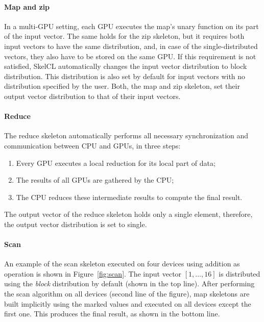 \paragraph{Map and zip}
In a multi-GPU setting, each GPU executes the map's unary function on its part of the input vector.
The same holds for the zip skeleton, but it requires both input vectors to have the same distribution, and, in case of the single-distributed vectors, they also have to be stored on the same GPU.
If this requirement is not satisfied, SkelCL automatically changes the input vector distribution to block distribution.
This distribution is also set by default for input vectors with no distribution specified by the user.
Both, the map and zip skeleton, set their output vector distribution to that of their input vectors.

\paragraph{Reduce}
The reduce skeleton automatically performs all necessary synchronization and communication between CPU and GPUs, in three steps:
\begin{enumerate}
 \item Every GPU executes a local reduction for its local part of data;
 \item The results of all GPUs are gathered by the CPU;
 \item The CPU reduces these intermediate results to compute the final result.
\end{enumerate}
The output vector of the reduce skeleton holds only a single element, therefore, the output vector distribution is set to single.

\paragraph{Scan}
An example of the scan skeleton executed on four devices using addition as operation is shown in Figure~\ref{fig:scan}.
The input vector $[1,\ldots,16]$ is distributed using the \emph{block} distribution by default (shown in the top line).
After performing the scan algorithm on all devices (second line of the figure), map skeletons are built implicitly using the marked values and executed on all devices except the first one.
This produces the final result, as shown in the bottom line.

